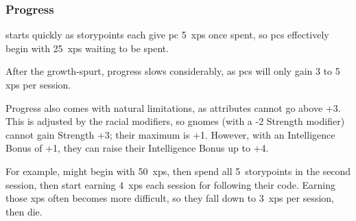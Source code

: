 \begin{multicols}{2}
\subsubsection{Progress}
starts quickly as \glspl{storypoint} each give \gls{pc} 5~\glspl{xp} once spent, so \glspl{pc} effectively begin with 25~\glspl{xp} waiting to be spent.


After the growth-spurt, progress slows considerably, as \glspl{pc} will only gain 3 to 5 \glspl{xp} per session.

\label{racial_limits}

Progress also comes with natural limitations, as \glspl{attribute} cannot go above +3.
This is adjusted by the racial modifiers, so gnomes (with a -2 Strength modifier) cannot gain Strength +3; their maximum is +1.
However, with an Intelligence Bonus of +1, they can raise their Intelligence Bonus up to +4.

For example,  might begin with 50~\glspl{xp}, then spend all 5~\glspl{storypoint} in the second session, then start earning 4~\glspl{xp} each session for following their code.
Earning those \glspl{xp} often becomes more difficult, so they fall down to 3~\glspl{xp} per session, then die.

\newcommand\describeFullCycle{%
  \showCycle~\arabic{fenestraDay}%
}

\setcounter{xp}{0}
\newcommand\runningXPtotal[1]{%
  \addtocounter{xp}{#1}%
  \setcounter{fp}{\value{xp}}%
  \divide\value{fp} by 10%
  \addtocounter{fp}{0}%
  \arabic{xp}
}

\setcounter{r12}{\month}
\setcounter{track}{\day}
\addtocounter{track}{20}

\newcommand\realMonth[1][7]{%
  \addtocounter{track}{#1}%
  \ifnum\value{track}>30%
    \addtocounter{track}{-30}%
    \stepcounter{r12}%
  \fi%
  \trackMonth[r12]~\arabic{track}%
  \setCycle{\value{r12}}{\value{track}}%
}


\end{multicols}
